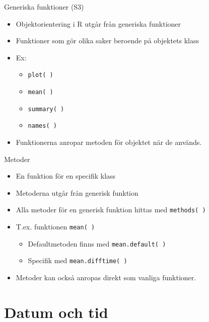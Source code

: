 \documentclass[
  11pt,
  ignorenonframetext,
  handout]{beamer}
\providecommand{\tightlist}{%
  \setlength{\itemsep}{0pt}\setlength{\parskip}{0pt}}
\begin{document}
\begin{frame}{Generiska funktioner (S3)}
\protect\hypertarget{generiska-funktioner-s3}{}
\begin{itemize}
\tightlist
\item
  Objektorientering i R utgår från generiska funktioner
\item
  Funktioner som gör olika saker beroende på objektets klass
\item
  Ex:

  \begin{itemize}
  \tightlist
  \item
    \texttt{plot( )}
  \item
    \texttt{mean( )}
  \item
    \texttt{summary( )}
  \item
    \texttt{names( )}
  \end{itemize}
\item
  Funktionerna anropar metoden för objektet när de används.
\end{itemize}
\end{frame}

\begin{frame}{Metoder}
\protect\hypertarget{metoder}{}
\begin{itemize}
\tightlist
\item
  En funktion för en specifik klass
\item
  Metoderna utgår från generisk funktion
\item
  Alla metoder för en generisk funktion hittas med \texttt{methods( )}
\item
  T.ex. funktionen \texttt{mean( )}

  \begin{itemize}
  \tightlist
  \item
    Defaultmetoden finns med \texttt{mean.default( )}
  \item
    Specifik med \texttt{mean.difftime( )}
  \end{itemize}
\item
  Metoder kan också anropas direkt som vanliga funktioner.
\end{itemize}
\end{frame}

\hypertarget{datum-och-tid}{%
\section{Datum och tid}\label{datum-och-tid}}
\end{document}
